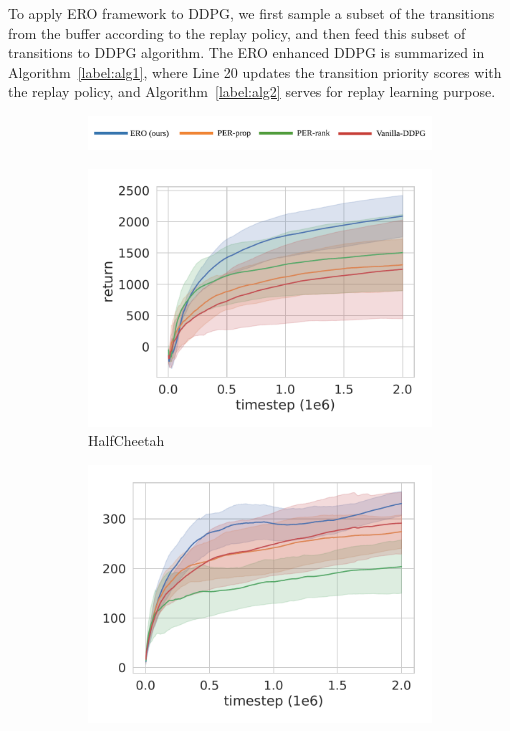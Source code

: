 \documentclass{article}
\begin{document}
To apply ERO framework to DDPG, we first sample a subset of the transitions from the buffer according to the replay policy, and then feed this subset of transitions to DDPG algorithm. The ERO enhanced DDPG is summarized in Algorithm~\ref{label:alg1}, where Line 20 updates the transition priority scores with the replay policy, and Algorithm~\ref{label:alg2} serves for replay learning purpose.





\begin{figure}
  \centering
  \begin{subfigure}[b]{0.60\textwidth}
    \includegraphics[width=1.0\textwidth]{legend.pdf}
  \end{subfigure}
  \vspace{-15pt}
  \begin{subfigure}[b]{0.25\textwidth}
    \includegraphics[width=\textwidth]{HalfCheetah-v2.pdf}
    \caption{HalfCheetah}
    \vspace{15pt}
  \end{subfigure}%
  \begin{subfigure}[b]{0.25\textwidth}
    \includegraphics[width=\textwidth]{InvertedPendulum-v2.pdf}

\end{subfigure}
\end{figure}
\end{document}
